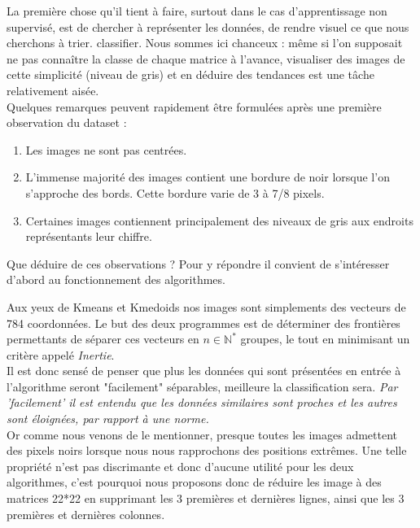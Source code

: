 \documentclass{article}
\begin{document}
La première chose qu'il tient à faire, surtout dans le cas d'apprentissage non supervisé, est de chercher à représenter les données, de rendre visuel ce que nous cherchons à trier. classifier. Nous sommes ici chanceux : même si l'on supposait ne pas connaître la classe de chaque matrice à l'avance, visualiser des images de cette simplicité (niveau de gris) et en déduire des tendances est une tâche relativement aisée. \\
Quelques remarques peuvent rapidement être formulées après une première observation du dataset : 

\begin{enumerate}
    \item Les images ne sont pas centrées.
    \item L'immense majorité des images contient une bordure de noir lorsque l'on s'approche des bords. Cette bordure varie de 3 à 7/8 pixels.
    \item Certaines images contiennent principalement des niveaux de gris aux endroits représentants leur chiffre.
\end{enumerate}

Que déduire de ces observations ? Pour y répondre il convient de s'intéresser d'abord au fonctionnement des algorithmes.

Aux yeux de Kmeans et Kmedoids nos images sont simplements des vecteurs de 784 coordonnées. Le but des deux programmes est de déterminer des frontières permettants de séparer ces vecteurs en $n \in \mathbb{N}^*$ groupes, le tout en minimisant un critère appelé \textit{Inertie}. 
\\

Il est donc sensé de penser que plus les données qui sont présentées en entrée  à l'algorithme seront "facilement" séparables, meilleure la classification sera. \newline
\textit{Par 'facilement' il est entendu que les données similaires sont proches et les autres sont éloignées, par rapport à une norme.} \\

Or comme nous venons de le mentionner, presque toutes les images admettent des pixels noirs lorsque nous nous rapprochons des positions extrêmes. Une telle propriété n'est pas discrimante et donc d'aucune utilité pour les deux algorithmes, c'est pourquoi nous proposons donc de réduire les image à des matrices 22*22 en supprimant les 3 premières et dernières lignes, ainsi que les 3 premières et dernières colonnes. \\
\end{document}
